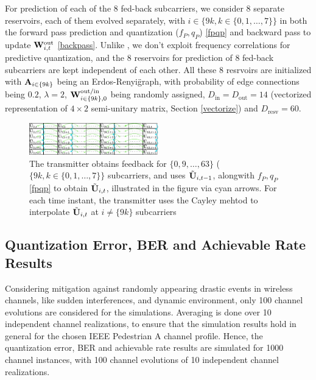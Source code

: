 \documentclass[conference]{IEEEtran}
\begin{document}
For prediction of each of the $8$ fed-back subcarriers, we consider $8$ separate reservoirs, each of them evolved separately, with $i\in\{9k, k \in \{0,1,\ldots,7\}\}$ in both the forward pass prediction and quantization ($f_P,q_P$) \eqref{fpqp} and backward pass to update ${\bf W}_{i,t}^{\text{out}}$ \eqref{backpass}. Unlike \cite{Gupt1905:Predictive}, we don't exploit frequency correlations for predictive quantization, and the $8$ reservoirs for prediction of $8$ fed-back subcarriers are kept independent of each other. All these 8 resrvoirs are initialized with ${\bf A}_{i\in\{9k\}}$ being an Erdos-Renyi\" graph, with probability of edge connections being $0.2$, $\lambda=2$, ${\bf W}^{\text{out/in}}_{i\in\{9k\},0}$ being randomly assigned, $D_{\text{in}}=D_{\text{out}}=14$ (vectorized representation of $4\times2$ semi-unitary matrix, Section \ref{vectorize}) and $D_{\text{resv}}=60$.

\begin{figure}
\centering
\includegraphics[width=0.5\textwidth]{images/table.pdf}
\caption{The transmitter obtains feedback for $\{0,9,\ldots,63\}$ ($\{9k, k \in \{0,1,\ldots,7\}\}$ subcarriers, and uses $\tilde{{\bf U}}_{i,t-1}$, alongwith $f_P,q_P$ \eqref{fpqp} to obtain $\tilde{{\bf U}}_{i,t}$, illustrated in the figure via cyan arrows. For each time instant, the transmitter uses the Cayley mehtod to interpolate $\tilde{{\bf U}}_{i,t}$ at $i\neq\{9k\}$ subcarriers}
\label{table}
\end{figure}

\subsection{Quantization Error, BER and Achievable Rate Results}
\label{res}{}
Considering mitigation against randomly appearing drastic events in wireless channels, like sudden interferences, and dynamic environment, only 100 channel evolutions are considered for the simulations. Averaging is done over 10 independent channel realizations, to ensure that the simulation results hold in general for the chosen IEEE Pedestrian A channel profile. Hence, the quantization error, BER and achievable rate results are simulated for 1000 channel instances, with 100 channel evolutions of 10 independent channel realizations.
\end{document}
